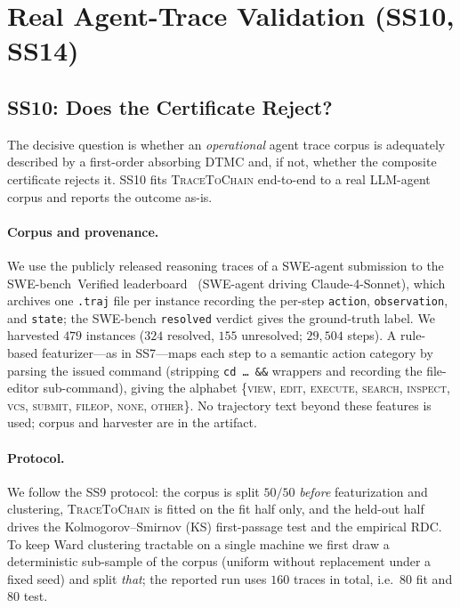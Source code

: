 \section{Real Agent-Trace Validation (SS10, SS14)}
\label{sec:ss10}

\subsection{SS10: Does the Certificate Reject?}

The decisive question is whether an \emph{operational} agent trace corpus is
adequately described by a first-order absorbing DTMC and, if not, whether the
composite certificate rejects it. SS10 fits \textsc{TraceToChain} end-to-end
to a real LLM-agent corpus and reports the outcome as-is.

\paragraph{Corpus and provenance.}
We use the publicly released reasoning traces of a SWE-agent submission to the
SWE-bench~Verified leaderboard~\cite{swebench2024} (SWE-agent driving
Claude-4-Sonnet), which archives one \texttt{.traj} file per instance recording
the per-step \texttt{action}, \texttt{observation}, and \texttt{state}; the
SWE-bench \texttt{resolved} verdict gives the ground-truth label. We harvested
$479$ instances ($324$ resolved, $155$ unresolved; $29{,}504$ steps). A
rule-based featurizer---as in SS7---maps each step to a semantic action
category by parsing the issued command (stripping \texttt{cd~\ldots~\&\&}
wrappers and recording the file-editor sub-command), giving the alphabet
\{\textsc{view}, \textsc{edit}, \textsc{execute}, \textsc{search},
\textsc{inspect}, \textsc{vcs}, \textsc{submit}, \textsc{fileop},
\textsc{none}, \textsc{other}\}. No trajectory text beyond these features is
used; corpus and harvester are in the artifact.

\paragraph{Protocol.}
We follow the SS9 protocol: the corpus is split $50/50$ \emph{before}
featurization and clustering, \textsc{TraceToChain} is fitted on the fit half
only, and the held-out half drives the Kolmogorov--Smirnov (KS) first-passage
test and the empirical RDC. To keep Ward clustering tractable on a single
machine we first draw a deterministic sub-sample of the corpus (uniform
without replacement under a fixed seed) and split \emph{that}; the reported
run uses $160$ traces in total, i.e.\ $80$ fit and $80$ test.

